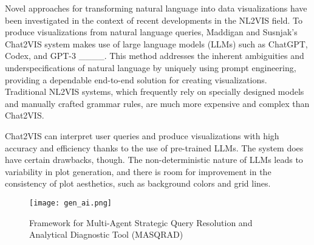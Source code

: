 Novel approaches for transforming natural language into data visualizations have been investigated in the context of recent developments in the NL2VIS field. To produce visualizations from natural language queries, Maddigan and Susnjak's Chat2VIS system makes use of large language models (LLMs) such as ChatGPT, Codex, and GPT-3 ____. This method addresses the inherent ambiguities and underspecifications of natural language by uniquely using prompt engineering, providing a dependable end-to-end solution for creating visualizations. Traditional NL2VIS systems, which frequently rely on specially designed models and manually crafted grammar rules, are much more expensive and complex than Chat2VIS. 

Chat2VIS can interpret user queries and produce visualizations with high accuracy and efficiency thanks to the use of pre-trained LLMs. The system does have certain drawbacks, though. The non-deterministic nature of LLMs leads to variability in plot generation, and there is room for improvement in the consistency of plot aesthetics, such as background colors and grid lines.

\begin{figure*}[!t]
    \centering
    \captionsetup{justification=centering}
    \texttt{[image: gen\_ai.png]}
    \caption{Framework for Multi-Agent Strategic Query Resolution and Analytical Diagnostic Tool (MASQRAD)}
    \label{fig:framework}
\end{figure*}

